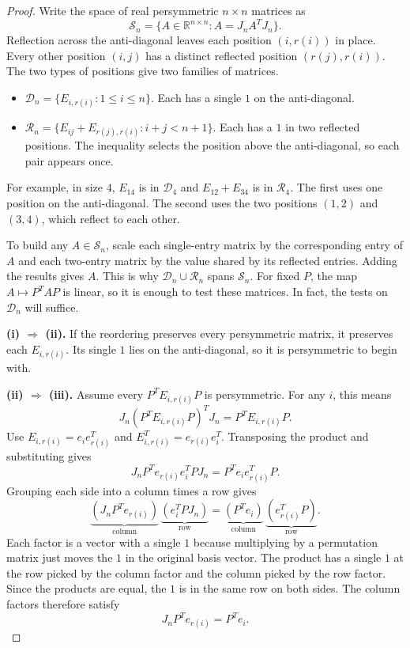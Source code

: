 \documentclass[11pt,a4paper]{article}
\begin{document}
\begin{proof}
Write the space of real persymmetric $n\times n$ matrices as
\[
 \mathcal S_n=\{A\in\mathbb{R}^{n\times n}:A=J_n A^TJ_n\}.
\]
Reflection across the anti-diagonal leaves each position $(i,r(i))$ in
place. Every other position $(i,j)$ has a distinct reflected position
$(r(j),r(i))$. The two types of positions give two families of matrices.
\begin{itemize}
 \item $\mathcal D_n=\{E_{i,r(i)}:1\leq i\leq n\}$.
   Each has a single $1$ on the anti-diagonal.
 \item $\mathcal R_n=\{E_{ij}+E_{r(j),r(i)}:i+j<n+1\}$.
   Each has a $1$ in two reflected positions. The inequality selects
   the position above the anti-diagonal, so each pair appears once.
\end{itemize}
For example, in size $4$, $E_{14}$ is in $\mathcal D_4$ and
$E_{12}+E_{34}$ is in $\mathcal R_4$. The first uses one position on
the anti-diagonal. The second uses the two positions $(1,2)$ and $(3,4)$,
which reflect to each other.

To build any $A\in\mathcal S_n$, scale each single-entry matrix by the
corresponding entry of $A$ and each two-entry matrix by the value
shared by its reflected entries. Adding the results gives $A$.
This is why $\mathcal D_n\cup\mathcal R_n$ spans $\mathcal S_n$.
For fixed $P$, the map $A\mapsto P^TAP$ is linear, so it is enough to
test these matrices. In fact, the tests on $\mathcal D_n$ will suffice.

\textbf{(i) $\Rightarrow$ (ii).}
If the reordering preserves every persymmetric matrix, it preserves
each $E_{i,r(i)}$. Its single $1$ lies on the anti-diagonal, so it is
persymmetric to begin with.

\newpage
\textbf{(ii) $\Rightarrow$ (iii).}
Assume every $P^TE_{i,r(i)}P$ is persymmetric. For any $i$, this means
\[
 J_n(P^TE_{i,r(i)}P)^TJ_n=P^TE_{i,r(i)}P.
\]
Use $E_{i,r(i)}=e_i e_{r(i)}^T$ and $E_{i,r(i)}^T=e_{r(i)}e_i^T$.
Transposing the product and substituting gives
\[
 J_n P^T e_{r(i)} e_i^T PJ_n=P^T e_i e_{r(i)}^T P.
\]
Grouping each side into a column times a row gives
\[
 \underbrace{(J_n P^T e_{r(i)})}_{\text{column}}\,
 \underbrace{(e_i^T PJ_n)}_{\text{row}}
 =
 \underbrace{(P^T e_i)}_{\text{column}}\,
 \underbrace{(e_{r(i)}^T P)}_{\text{row}}.
\]
Each factor is a vector with a single $1$ because multiplying by a
permutation matrix just moves the $1$ in the original basis vector.
The product has a single $1$ at the row picked by the column factor
and the column picked by the row factor. Since the products are equal,
the $1$ is in the same row on both sides. The column factors therefore satisfy
\[
 J_n P^T e_{r(i)}=P^T e_i.
\]


\end{proof}
\end{document}
